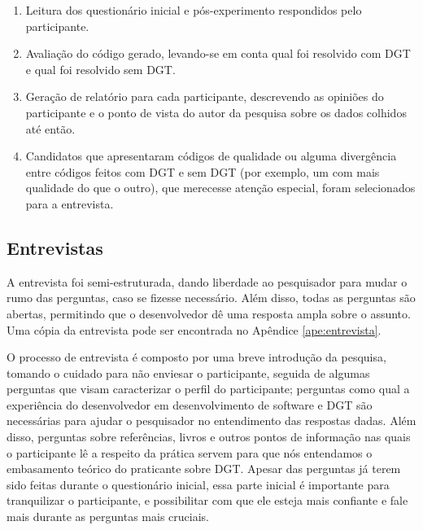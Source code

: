 \begin{enumerate}
	\item Leitura dos questionário inicial e pós-experimento respondidos pelo participante.
	
	\item Avaliação do código gerado, levando-se em conta qual foi resolvido com DGT e qual
	foi resolvido sem DGT.
	
	\item Geração de relatório para cada participante, descrevendo as opiniões do participante
	e o ponto de vista do autor da pesquisa sobre os dados colhidos até então.
	
	\item Candidatos que apresentaram códigos de qualidade ou alguma divergência entre códigos
	feitos com DGT e sem DGT (por exemplo, um com mais qualidade do que o outro), que merecesse
	atenção especial, foram selecionados para a entrevista.
\end{enumerate}

\subsection{Entrevistas}
\label{sec:planejamento-estrategia-entrevistas}

A entrevista foi semi-estruturada, dando liberdade ao
pesquisador para mudar o rumo das perguntas, caso se fizesse necessário.
Além disso, todas as perguntas são abertas, permitindo que o desenvolvedor dê
uma resposta ampla sobre o assunto. Uma cópia da entrevista pode ser encontrada
no Apêndice \ref{ape:entrevista}.

O processo de entrevista é composto por uma breve introdução da pesquisa, tomando
o cuidado para não enviesar o participante, seguida de algumas perguntas que visam
caracterizar o perfil do participante; perguntas como qual a experiência do
desenvolvedor em desenvolvimento de software e DGT são necessárias para ajudar o
pesquisador no entendimento das respostas dadas. Além disso, perguntas sobre
referências, livros e outros pontos de informação nas quais o participante lê a
respeito da prática servem para que nós entendamos o embasamento teórico
do praticante sobre DGT. Apesar das perguntas já terem sido feitas durante
o questionário inicial, essa parte inicial é importante para tranquilizar
o participante, e possibilitar com que ele esteja mais confiante e fale
mais durante as perguntas mais cruciais.

